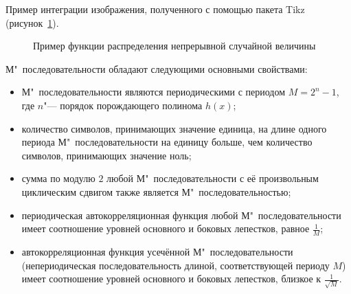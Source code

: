 Пример интеграции изображения, полученного с помощью пакета Tikz (рисунок~\ref{labN_fig:probability}).

\begin{figure}[pt!]
	\centering
	\scalebox{.85}{}
	\caption{Пример функции распределения непрерывной случайной величины}
	\label{labN_fig:probability}
\end{figure}

	
М"~последовательности обладают следующими основными свойствами:	
\renewcommand{\labelitemi}{--}
\begin{itemize}
    \item М"~последовательности являются периодическими с периодом $M=2^n-1$, где $n$"--- порядок порождающего полинома $h(x)$;
    \item количество символов, принимающих значение единица, на длине одного периода М"~последовательности на единицу больше, чем количество символов, принимающих значение ноль;
    \item сумма по модулю $2$ любой М"~последовательности с её произвольным циклическим сдвигом также является М"~последовательностью;
    \item периодическая автокорреляционная функция любой М"~последовательности имеет соотношение уровней основного и боковых лепестков, равное $\displaystyle\frac{1}{M}$;
    \item автокорреляционная функция усечённой М"~последовательности (непериодическая последовательность длиной, соответствующей периоду $M$) имеет соотношение уровней основного и боковых лепестков, близкое к $\displaystyle\frac{1}{\sqrt{M}}$.
\end{itemize}
\vspace{10mm}